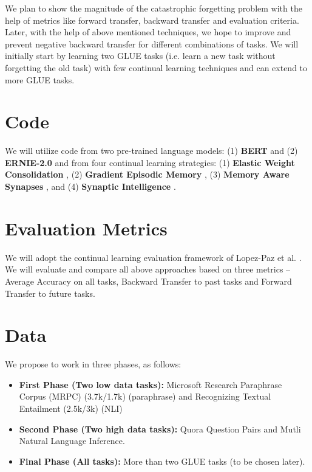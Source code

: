 \documentclass[11pt,a4paper]{article}
\begin{document}
We plan to show the magnitude of the catastrophic forgetting problem with the help of metrics like forward transfer, backward transfer and evaluation criteria.  Later, with the help of above mentioned techniques, we hope to improve and prevent negative backward transfer for different combinations of tasks. We will initially start by learning two GLUE tasks (i.e. learn a new task without forgetting the old task) with few continual learning techniques and can extend to more GLUE tasks.

\section{Code}
We will utilize code from two pre-trained language models: (1) \textbf{BERT} \cite{DBLP:journals/corr/abs-1810-04805} and (2) \textbf{ERNIE-2.0} \cite{DBLP:journals/corr/abs-1907-12412} and from four continual learning strategies: (1) \textbf{Elastic Weight Consolidation} \cite{EWC}, (2) \textbf{Gradient Episodic Memory} \cite{GEM}, (3) \textbf{Memory Aware Synapses} \cite{MAS}, and (4) \textbf{Synaptic Intelligence} \cite{SI}.


\section{Evaluation Metrics}
We will adopt the continual learning evaluation framework of Lopez-Paz et al. \cite{DBLP:journals/corr/Lopez-PazR17}.  We will evaluate and compare all above approaches based on three metrics -- Average Accuracy on all tasks, Backward Transfer to past tasks and Forward Transfer to future tasks.

\section{Data}
We propose to work in three phases, as follows:
\begin{itemize}
  \item \textbf{First Phase (Two low data tasks):} Microsoft Research Paraphrase Corpus (MRPC) (3.7k/1.7k) (paraphrase) and Recognizing Textual Entailment (2.5k/3k) (NLI)
  \item \textbf{Second Phase (Two high data tasks):} Quora Question Pairs and Mutli Natural Language Inference. 
  \item \textbf{Final Phase (All tasks):} More than two GLUE tasks (to be chosen later).
\end{itemize}



\end{document}
